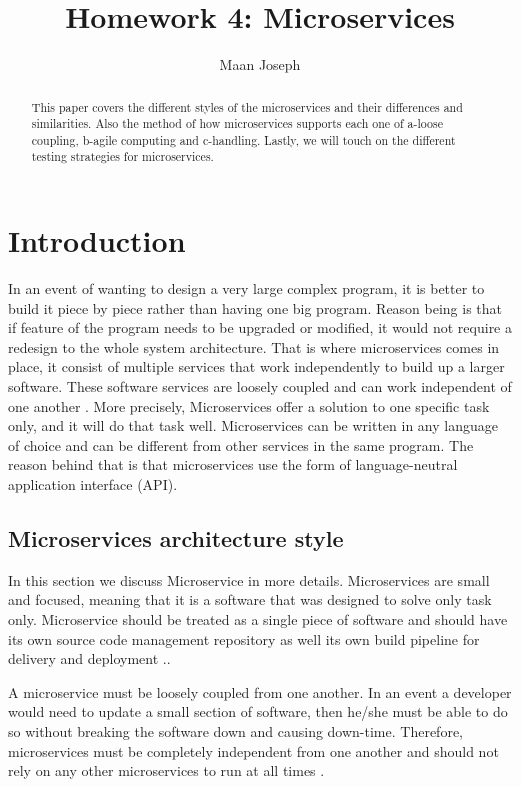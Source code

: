 \documentclass{IEEEtran}
\title{Homework 4: Microservices}
\author{Maan Joseph}
\begin{document}
	\maketitle
	\begin{abstract}
		This paper covers the different styles of the microservices and their differences and similarities. Also the method of how microservices supports each one of a-loose coupling, b-agile computing and c-handling. Lastly, we will touch on the different testing strategies for microservices.   
	\end{abstract}

	\section{Introduction}
		In an event of wanting to design a very large complex program, it is better to build it piece by piece rather than having one big program. Reason being is that if feature of the program needs to be upgraded or modified, it would not require a redesign to the whole system architecture. That is where microservices comes in place, it consist of multiple services that work independently to build up a larger software. These software services are loosely coupled and can work independent of one another \cite{ibmred}. More precisely, Microservices offer a solution to one specific task only, and it will do that task well. Microservices can be written in any language of choice and can be different from other services in the same program. The reason behind that is that microservices use the form of language-neutral application interface (API).


		\subsection{Microservices architecture style}
			In this section we discuss Microservice in more details. Microservices are small and focused, meaning that it is a software that was designed to solve only task only. Microservice should be treated as a single piece of software and should have its own source code management repository as well its own build pipeline for delivery and deployment \cite{ibmred}..
			\newline
			
			
			A microservice must be loosely coupled from one another. In an event a developer would need to update a small section of software, then he/she must be able to do so without breaking the software down and causing down-time. Therefore, microservices must be completely independent from one another and should not rely on any other microservices to run at all times \cite{ibmred}.
			\newline
			
\end{document}
